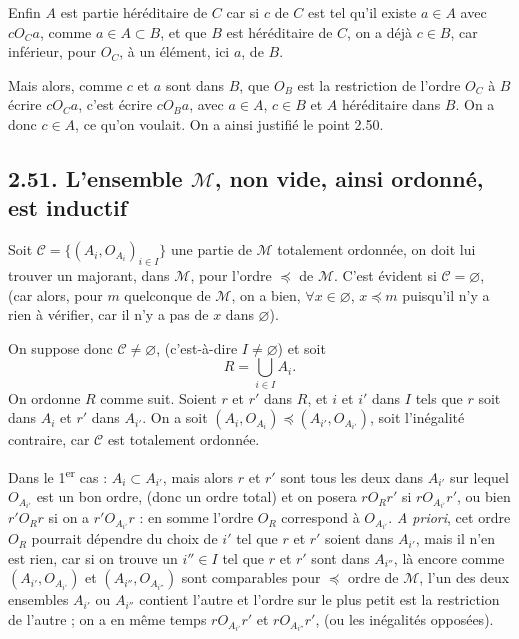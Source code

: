 Enfin $A$ est partie héréditaire de $C$ car si $c$ de $C$ est tel qu'il existe $a\in A$ avec $cO_Ca$, comme $a\in A\subset B$, et que $B$ est héréditaire de $C$, on a déjà $c\in B$, car inférieur, pour $O_C$, à un élément, ici $a$, de $B$.

Mais alors, comme $c$ et $a$ sont dans $B$, que $O_B$ est la restriction de l'ordre $O_C$ à $B$ écrire $cO_Ca$, c'est écrire $cO_Ba$, avec $a\in A$, $c\in B$ et $A$ héréditaire dans $B$. On a donc $c\in A$, ce qu'on voulait. On a ainsi justifié le point 2.50. \bookend

\subsection*{2.51. L'ensemble $\mathcal M$, non vide, ainsi ordonné, est inductif}

Soit $\mathcal C=\{(A_i,O_{A_i})_{i\in I}\}$ une partie de $\mathcal M$ totalement ordonnée, on doit lui trouver un majorant, dans $\mathcal M$, pour l'ordre $\preccurlyeq$ de $\mathcal M$. C'est évident si $\mathcal C=\varnothing$, (car alors, pour $m$ quelconque de $\mathcal M$, on a bien, $\forall x\in\varnothing$, $x\preccurlyeq m$ puisqu'il n'y a rien à vérifier, car il n'y a pas de $x$ dans $\varnothing$).

On suppose donc $\mathcal C\ne\varnothing$, (c'est-à-dire $I\ne\varnothing$) et soit
\[
R=\bigcup_{i\in I}A_i.
\]
On ordonne $R$ comme suit. Soient $r$ et $r'$ dans $R$, et $i$ et $i'$ dans $I$ tels que $r$ soit dans $A_i$ et $r'$ dans $A_{i'}$. On a soit $(A_i,O_{A_i})\preccurlyeq(A_{i'},O_{A_{i'}})$, soit l'inégalité contraire, car $\mathcal C$ est totalement ordonnée.

Dans le 1\textsuperscript{er} cas : $A_i\subset A_{i'}$, mais alors $r$ et $r'$ sont tous les deux dans $A_{i'}$ sur lequel $O_{A_{i'}}$ est un bon ordre, (donc un ordre total) et on posera $rO_Rr'$ si $rO_{A_{i'}}r'$, ou bien $r'O_Rr$ si on a $r'O_{A_{i'}}r$ : en somme l'ordre $O_R$ correspond à $O_{A_{i'}}$. \emph{A priori}, cet ordre $O_R$ pourrait dépendre du choix de $i'$ tel que $r$ et $r'$ soient dans $A_{i'}$, mais il n'en est rien, car si on trouve un $i''\in I$ tel que $r$ et $r'$ sont dans $A_{i''}$, là encore comme $(A_{i'},O_{A_{i'}})$ et $(A_{i''},O_{A_{i''}})$ sont comparables pour $\preccurlyeq$ ordre de $\mathcal M$, l'un des deux ensembles $A_{i'}$ ou $A_{i''}$ contient l'autre et l'ordre sur le plus petit est la restriction de l'autre ; on a en même temps $rO_{A_{i'}}r'$ et $rO_{A_{i''}}r'$, (ou les inégalités opposées).

